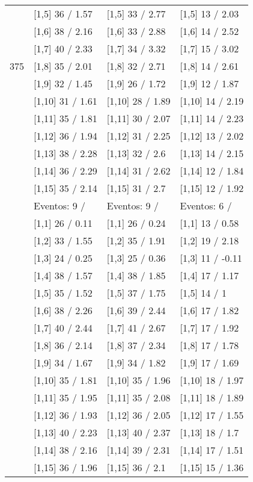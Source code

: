 \begin{table}
\begin{tabular}[t]{llll}
 & {}[1,5] 36  / 1.57 & {}[1,5] 33  / 2.77 & {}[1,5] 13  / 2.03\\
 & {}[1,6] 38  / 2.16 & {}[1,6] 33  / 2.88 & {}[1,6] 14  / 2.52\\
 & {}[1,7] 40  / 2.33 & {}[1,7] 34  / 3.32 & {}[1,7] 15  / 3.02\\
375 & {}[1,8] 35  / 2.01 & {}[1,8] 32  / 2.71 & {}[1,8] 14  / 2.61\\
\addlinespace
 & {}[1,9] 32  / 1.45 & {}[1,9] 26  / 1.72 & {}[1,9] 12  / 1.87\\
 & {}[1,10] 31  / 1.61 & {}[1,10] 28  / 1.89 & {}[1,10] 14  / 2.19\\
 & {}[1,11] 35  / 1.81 & {}[1,11] 30  / 2.07 & {}[1,11] 14  / 2.23\\
 & {}[1,12] 36  / 1.94 & {}[1,12] 31  / 2.25 & {}[1,12] 13  / 2.02\\
 & {}[1,13] 38  / 2.28 & {}[1,13] 32  / 2.6 & {}[1,13] 14  / 2.15\\
\addlinespace
 & {}[1,14] 36  / 2.29 & {}[1,14] 31  / 2.62 & {}[1,14] 12  / 1.84\\
 & {}[1,15] 35  / 2.14 & {}[1,15] 31  / 2.7 & {}[1,15] 12  / 1.92\\
 & Eventos:  9 / & Eventos:  9 / & Eventos:  6 /\\
 & {}[1,1] 26  / 0.11 & {}[1,1] 26  / 0.24 & {}[1,1] 13  / 0.58\\
 & {}[1,2] 33  / 1.55 & {}[1,2] 35  / 1.91 & {}[1,2] 19  / 2.18\\
\addlinespace
 & {}[1,3] 24  / 0.25 & {}[1,3] 25  / 0.36 & {}[1,3] 11  / -0.11\\
 & {}[1,4] 38  / 1.57 & {}[1,4] 38  / 1.85 & {}[1,4] 17  / 1.17\\
 & {}[1,5] 35  / 1.52 & {}[1,5] 37  / 1.75 & {}[1,5] 14  / 1\\
 & {}[1,6] 38  / 2.26 & {}[1,6] 39  / 2.44 & {}[1,6] 17  / 1.82\\
 & {}[1,7] 40  / 2.44 & {}[1,7] 41  / 2.67 & {}[1,7] 17  / 1.92\\
\addlinespace
500 & {}[1,8] 36  / 2.14 & {}[1,8] 37  / 2.34 & {}[1,8] 17  / 1.78\\
 & {}[1,9] 34  / 1.67 & {}[1,9] 34  / 1.82 & {}[1,9] 17  / 1.69\\
 & {}[1,10] 35  / 1.81 & {}[1,10] 35  / 1.96 & {}[1,10] 18  / 1.97\\
 & {}[1,11] 35  / 1.95 & {}[1,11] 35  / 2.08 & {}[1,11] 18  / 1.89\\
 & {}[1,12] 36  / 1.93 & {}[1,12] 36  / 2.05 & {}[1,12] 17  / 1.55\\
\addlinespace
 & {}[1,13] 40  / 2.23 & {}[1,13] 40  / 2.37 & {}[1,13] 18  / 1.7\\
 & {}[1,14] 38  / 2.16 & {}[1,14] 39  / 2.31 & {}[1,14] 17  / 1.51\\
 & {}[1,15] 36  / 1.96 & {}[1,15] 36  / 2.1 & {}[1,15] 15  / 1.36\\
\bottomrule
\end{tabular}
\end{table}
